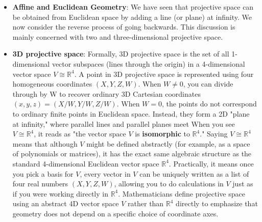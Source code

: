 \documentclass{report}
\begin{document}
\begin{itemize}
            \begin{itemize}
                \item \([0,0,1]^T\):	The ordinary two-dimensional origin \((0,0)\)
                \item \([X,Y,0]^T\), with \(X,Y\) not both zero:	A point at infinity representing a direction
                \item \([0,0,0]^T\):	Invalid; represents no projective point
            \end{itemize}
            Thus, \(W=0\) describes a point at infinity only when the remaining coordinates are not all zero.
        \item \textbf{Affine and Euclidean Geometry}: We have seen that projective space can be obtained from Euclidean space by adding a line (or plane) at infinity. We now consider the reverse process of going backwards. This discussion is mainly concerned with two and three-dimensional projective space.
        \item \textbf{3D projective space}: Formally, 3D projective space is the set of all 1-dimensional vector subspaces (lines through the origin) in a 4-dimensional vector space \(V \cong \mathbb{R}^4\).
            \bigbreak \noindent 
            A point in 3D projective space is represented using four homogeneous coordinates $(X, Y, Z, W)$. When $W \ne 0$, you can divide through by W to recover ordinary 3D Cartesian coordinates $(x, y, z) = (X/W, Y/W, Z/W)$. 
            \bigbreak \noindent 
            When $W = 0$, the points do not correspond to ordinary finite points in Euclidean space. Instead, they form a 2D "plane at infinity," where parallel lines and parallel planes meet
            \bigbreak \noindent 
            When you see \(V \cong \mathbb{R}^4\), it reads as "the vector space \(V\) is \textbf{isomorphic} to \(\mathbb{R}^{4}\)."
            \bigbreak \noindent 
            Saying \(V \cong \mathbb{R}^4\) means that although \(V\) might be defined abstractly (for example, as a space of polynomials or matrices), it has the exact same algebraic structure as the standard 4-dimensional Euclidean vector space \(\mathbb{R}^{4}\).
            \bigbreak \noindent 
            Practically, it means once you pick a basis for \(V\), every vector in \(V\) can be uniquely written as a list of four real numbers \((X, Y, Z, W)\), allowing you to do calculations in \(V\) just as if you were working directly in \(\mathbb{R}^{4}\).
            \bigbreak \noindent 
            Mathematicians define projective space using an abstract 4D vector space \(V\) rather than \(\mathbb{R}^{4}\) directly to emphasize that geometry does not depend on a specific choice of coordinate axes.

\end{itemize}
\end{document}
